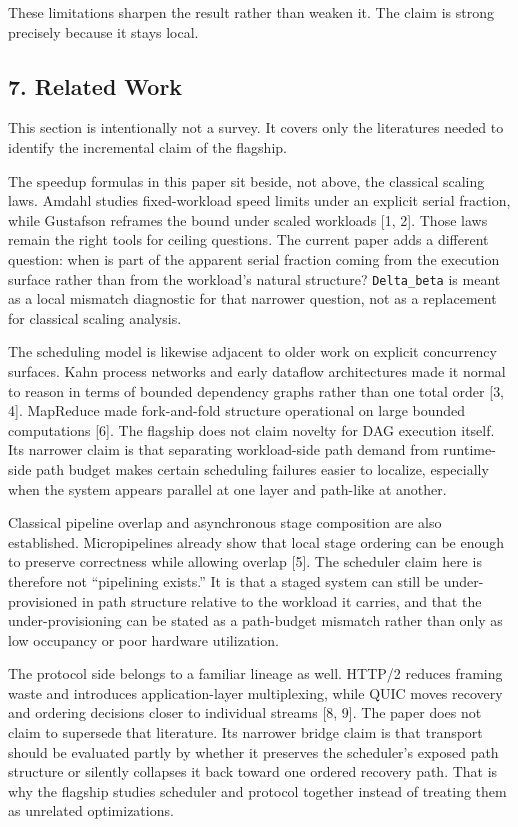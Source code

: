 \documentclass[
  11pt,
]{article}
\begin{document}
These limitations sharpen the result rather than weaken it. The claim is
strong precisely because it stays local.

\subsection{7. Related Work}\label{related-work}

This section is intentionally not a survey. It covers only the
literatures needed to identify the incremental claim of the flagship.

The speedup formulas in this paper sit beside, not above, the classical
scaling laws. Amdahl studies fixed-workload speed limits under an
explicit serial fraction, while Gustafson reframes the bound under
scaled workloads {[}1, 2{]}. Those laws remain the right tools for
ceiling questions. The current paper adds a different question: when is
part of the apparent serial fraction coming from the execution surface
rather than from the workload's natural structure? \texttt{Delta\_beta}
is meant as a local mismatch diagnostic for that narrower question, not
as a replacement for classical scaling analysis.

The scheduling model is likewise adjacent to older work on explicit
concurrency surfaces. Kahn process networks and early dataflow
architectures made it normal to reason in terms of bounded dependency
graphs rather than one total order {[}3, 4{]}. MapReduce made
fork-and-fold structure operational on large bounded computations
{[}6{]}. The flagship does not claim novelty for DAG execution itself.
Its narrower claim is that separating workload-side path demand from
runtime-side path budget makes certain scheduling failures easier to
localize, especially when the system appears parallel at one layer and
path-like at another.

Classical pipeline overlap and asynchronous stage composition are also
established. Micropipelines already show that local stage ordering can
be enough to preserve correctness while allowing overlap {[}5{]}. The
scheduler claim here is therefore not ``pipelining exists.'' It is that
a staged system can still be under-provisioned in path structure
relative to the workload it carries, and that the under-provisioning can
be stated as a path-budget mismatch rather than only as low occupancy or
poor hardware utilization.

The protocol side belongs to a familiar lineage as well. HTTP/2 reduces
framing waste and introduces application-layer multiplexing, while QUIC
moves recovery and ordering decisions closer to individual streams {[}8,
9{]}. The paper does not claim to supersede that literature. Its
narrower bridge claim is that transport should be evaluated partly by
whether it preserves the scheduler's exposed path structure or silently
collapses it back toward one ordered recovery path. That is why the
flagship studies scheduler and protocol together instead of treating
them as unrelated optimizations.
\end{document}
